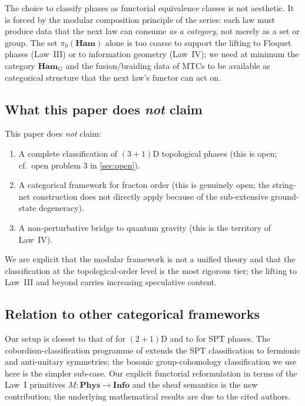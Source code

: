 \documentclass[12pt]{article}
\theoremstyle{plain}
\theoremstyle{definition}
\theoremstyle{remark}
\newcommand{\Ham}{\mathbf{Ham}}
\newcommand{\Phys}{\mathbf{Phys}}
\newcommand{\Info}{\mathbf{Info}}
\begin{document}
The choice to classify phases as functorial equivalence classes is not aesthetic. It is
forced by the modular composition principle of the series: each law must produce data
that the next law can consume \emph{as a category}, not merely as a set or group. The set
$\pi_{0}(\Ham)$ alone is too coarse to support the lifting to Floquet phases (Law~III)
or to information geometry (Law~IV); we need at minimum the category $\Ham_{G}$ and the
fusion/braiding data of MTCs to be available as categorical structure that the next
law's functor can act on.

\subsection{What this paper does \emph{not} claim}

This paper does \emph{not} claim:
\begin{enumerate}[label=(\roman*)]
  \item A complete classification of $(3{+}1)$D topological phases (this is open; cf.\
    open problem 3 in \cref{sec:open}).
  \item A categorical framework for fracton order (this is genuinely open; the
    string-net construction does not directly apply because of the sub-extensive
    ground-state degeneracy).
  \item A non-perturbative bridge to quantum gravity (this is the territory of Law~IV).
\end{enumerate}
We are explicit that the modular framework is not a unified theory and that the
classification at the topological-order level is the most rigorous tier; the lifting to
Law~III and beyond carries increasing speculative content.

\subsection{Relation to other categorical frameworks}

Our setup is closest to that of \cite{LevinWen2005, Wang2010} for $(2{+}1)$D and to
\cite{ChenGuLiuWen2013} for SPT phases. The cobordism-classification programme of
\cite{FreedHopkins2021} extends the SPT classification to fermionic and anti-unitary
symmetries; the bosonic group-cohomology classification we use here is the simpler
sub-case. Our explicit functorial reformulation in terms of the Law~I primitives
$M:\Phys\to\Info$ and the sheaf semantics is the new contribution; the underlying
mathematical results are due to the cited authors.
\end{document}
